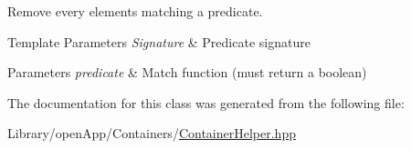 Remove every elements matching a predicate. 


\begin{DoxyTemplParams}{Template Parameters}
{\em Signature} & Predicate signature \\
\hline
\end{DoxyTemplParams}

\begin{DoxyParams}{Parameters}
{\em predicate} & Match function (must return a boolean) \\
\hline
\end{DoxyParams}


The documentation for this class was generated from the following file\+:\begin{DoxyCompactItemize}
\item 
Library/open\+App/\+Containers/\mbox{\hyperlink{_container_helper_8hpp}{Container\+Helper.\+hpp}}\end{DoxyCompactItemize}
